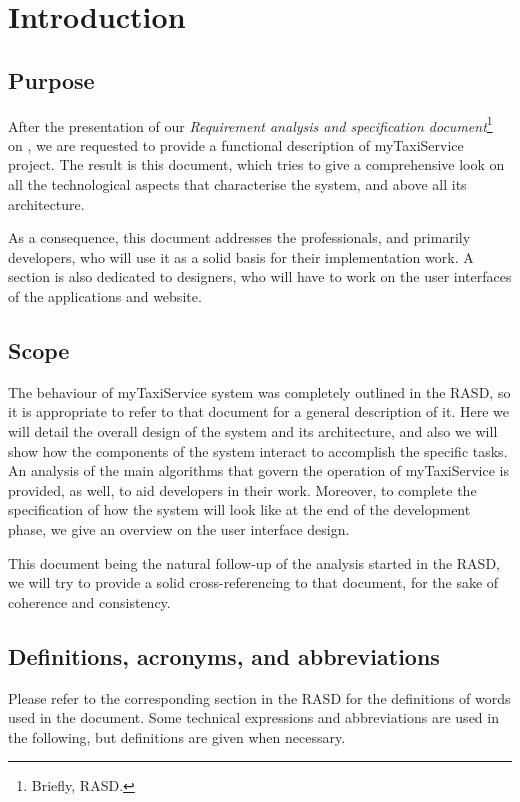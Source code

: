 \chapter{Introduction} \label{chap:introduction}


\section{Purpose}
After the presentation of our \emph{Requirement analysis and specification document}\footnote{Briefly, RASD.} on , we are requested to provide a functional description of myTaxiService project. The result is this document, which tries to give a comprehensive look on all the technological aspects that characterise the system, and above all its architecture.

As a consequence, this document addresses the professionals, and primarily developers, who will use it as a solid basis for their implementation work. A section is also dedicated to designers, who will have to work on the user interfaces of the applications and website.


\section{Scope}
The behaviour of myTaxiService system was completely outlined in the RASD, so it is appropriate to refer to that document for a general description of it. Here we will detail the overall design of the system and its architecture, and also we will show how the components of the system interact to accomplish the specific tasks. An analysis of the main algorithms that govern the operation of myTaxiService is provided, as well, to aid developers in their work. Moreover, to complete the specification of how the system will look like at the end of the development phase, we give an overview on the user interface design. 

This document being the natural follow-up of the analysis started in the RASD, we will try to provide a solid cross-referencing to that document, for the sake of coherence and consistency.


\section{Definitions, acronyms, and abbreviations}
Please refer to the corresponding section in the RASD for the definitions of words used in the document. Some technical expressions and abbreviations are used in the following, but definitions are given when necessary. 


